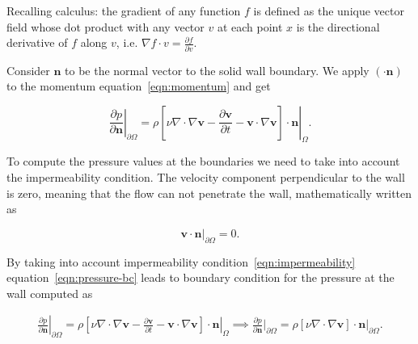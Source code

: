 \documentclass{article}
\begin{document}



Recalling calculus: the gradient of any function $f$ is defined as the unique vector field whose dot product with any vector $v$ at each point $x$ is the directional derivative of $f$ along $v$, i.e. $\nabla f \cdot v=\frac{\partial f}{\partial v}$.

Consider $\boldsymbol{n}$ to be the normal vector to the solid wall boundary. We apply $(\cdot\boldsymbol{n})$ to the momentum equation~\eqref{eqn:momentum} and get

\begin{equation}\label{eqn:pressure-bc}
\left.\frac{\partial p}{\partial \boldsymbol{n}}\right|_{\partial \Omega}=\left.\rho\left[\nu \nabla\cdot\nabla \boldsymbol{v}-\frac{\partial \boldsymbol{v}}{\partial t}-\boldsymbol{v} \cdot \nabla \boldsymbol{v}\right] \cdot \boldsymbol{n}\right|_{\Omega}.
\end{equation}


To compute the pressure values at the boundaries we need to take into account the impermeability condition. The velocity component perpendicular to the wall is zero, meaning that the flow can not penetrate the wall, mathematically written as

\begin{equation}
	\label{eqn:impermeability}
		\boldsymbol{v}\cdot 	\boldsymbol{n}\bigg|_{\partial \Omega}=0.
\end{equation} 

By taking into account impermeability condition~\eqref{eqn:impermeability} equation~\eqref{eqn:pressure-bc} leads to boundary condition for the pressure at the wall computed as

\begin{equation}\label{eqn:pressure-wall}
	\begin{aligned}
		\left.\frac{\partial p}{\partial \boldsymbol{n}}\right|_{\partial \Omega}=\left.\rho\left[\nu \nabla\cdot\nabla \boldsymbol{v}-\frac{\partial \boldsymbol{v}}{\partial t}-\boldsymbol{v} \cdot \nabla \boldsymbol{v}\right] \cdot \boldsymbol{n}\right|_{\Omega}\implies
		\frac{\partial p}{\partial \boldsymbol{n}}\bigg|_{\partial \Omega}=\rho \left[\nu \nabla \cdot \nabla \boldsymbol{v}\right]\cdot \boldsymbol{n}\bigg| _{\partial \Omega}.
	\end{aligned}
\end{equation}
\end{document}
